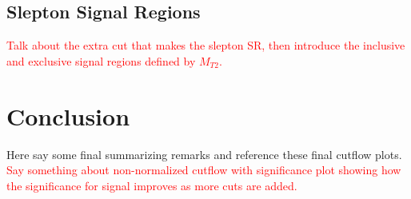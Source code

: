 \subsection{Slepton Signal Regions}
\label{sec:sr:mt2}
\textcolor{red}{Talk about the extra cut that makes the slepton SR, then introduce the inclusive and exclusive signal regions defined by $M_{T2}$.}
\begin{table}[]
 \tiny
\centering
{}
\caption{Slepton specific signal region cuts}
\label{tab:SRMLLMT2}
\end{table}

\iffalse
\section{Conclusion}
\label{sec:concl}
Here say some final summarizing remarks and reference these final cutflow plots.  \textcolor{red}{Say something about non-normalized cutflow with significance plot showing how the significance for signal improves as more cuts are added.}

